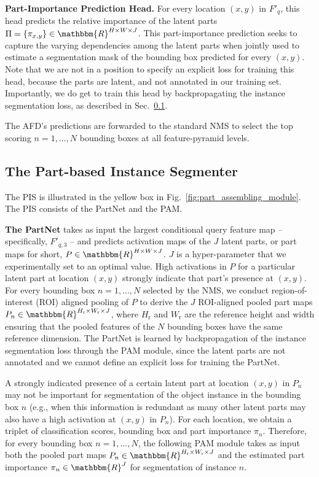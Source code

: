\documentclass[final]{cvpr}
\begin{document}
{\bf Part-Importance Prediction Head.}
For every location $(x,y)$ in $F'_q$, this head predicts the relative importance of the latent parts $\Pi=\{\pi_{x, y} \}\in \mathbbm{R}^{H\times W\times J}$. This part-importance prediction seeks to capture the varying dependencies among the latent parts when jointly used to estimate a segmentation mask of the bounding box predicted for every $(x,y)$. Note that we are not in a position to specify an explicit loss for training this head, because the parts are latent, and not annotated in our training set. Importantly, we do get to train this head by backpropagating the instance segmentation loss, as described in Sec.~\ref{sec:PIS}.

The AFD's predictions are forwarded to the standard NMS to select the top scoring $n=1,\dots,N$ bounding boxes at all feature-pyramid levels. 

\subsection{The Part-based Instance Segmenter}\label{sec:PIS}

The PIS is illustrated in the yellow box in Fig.~\ref{fig:part_assembling_module}. The PIS consists of the PartNet and the PAM.

\textbf{The PartNet} takes as input the largest conditional query feature map -- specifically, $F'_{q,3}$  -- and predicts  activation maps of the $J$ latent parts, or part maps for short, $P \in \mathbbm{R}^{H \times W \times J}$. $J$ is a hyper-parameter that we experimentally set to an optimal value. High activations in $P$ for a particular latent part at location  $(x,y)$ strongly indicate that part's       presence at $(x,y)$. For every bounding box $n=1,\dots,N$ selected by the NMS, we conduct region-of-interest (ROI) aligned pooling of $P$ to derive the $J$ ROI-aligned pooled part maps $P_n\in \mathbbm{R}^{H_{\text{r}}\times W_{\text{r}}\times J}$, where $H_{\text{r}}$ and $W_{\text{r}}$ are the reference height and width ensuring that the pooled features of the $N$ bounding boxes have the same reference dimension.  The PartNet is learned by backpropagation of the instance segmentation loss through the PAM module, since the latent parts are not annotated and we cannot define an explicit loss for training the PartNet.




A strongly indicated presence of a certain latent part at location $(x,y)$ in $P_n$ may not be important for segmentation of the object instance in the bounding box $n$ (e.g., when this information is redundant as many other latent parts may also have a high activation at $(x,y)$ in $P_n$). For each location, we obtain a triplet of classification scores, bounding box and part importance $\pi_n$. Therefore, for every bounding box  $n=1,\dots,N$, the following PAM module takes as input both the pooled part maps $P_n \in \mathbbm{R}^{H_{\text{r}}\times W_{\text{r}} \times J}$ and the estimated part importance $\pi_n \in \mathbbm{R}^{J}$ for  segmentation of instance $n$. 
\end{document}
